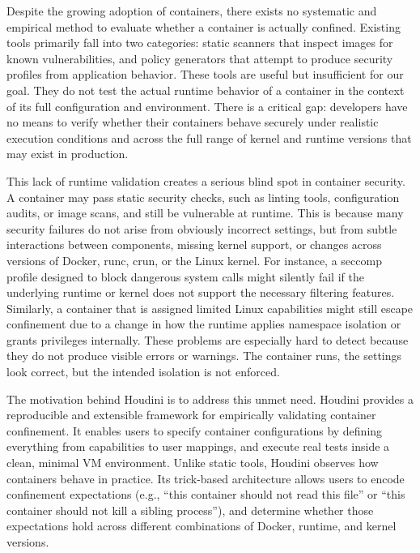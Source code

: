 \documentclass[12pt]{report}
\begin{document}
\begin{doublespace}
Despite the growing adoption of containers, there exists no systematic and empirical method to evaluate whether a container is actually confined. Existing tools primarily fall into two categories: static scanners that inspect images for known vulnerabilities, and policy generators that attempt to produce security profiles from application behavior. These tools are useful but insufficient for our goal. They do not test the actual runtime behavior of a container in the context of its full configuration and environment. There is a critical gap: developers have no means to verify whether their containers behave securely under realistic execution conditions and across the full range of kernel and runtime versions that may exist in production.

This lack of runtime validation creates a serious blind spot in container security. A container may pass static security checks, such as linting tools, configuration audits, or image scans, and still be vulnerable at runtime. This is because many security failures do not arise from obviously incorrect settings, but from subtle interactions between components, missing kernel support, or changes across versions of Docker, runc, crun, or the Linux kernel. For instance, a seccomp profile designed to block dangerous system calls might silently fail if the underlying runtime or kernel does not support the necessary filtering features. Similarly, a container that is assigned limited Linux capabilities might still escape confinement due to a change in how the runtime applies namespace isolation or grants privileges internally. These problems are especially hard to detect because they do not produce visible errors or warnings. The container runs, the settings look correct, but the intended isolation is not enforced.

The motivation behind Houdini is to address this unmet need. Houdini provides a reproducible and extensible framework for empirically validating container confinement. It enables users to specify container configurations by defining everything from capabilities to user mappings, and execute real tests inside a clean, minimal VM environment. Unlike static tools, Houdini observes how containers behave in practice. Its trick-based architecture allows users to encode confinement expectations (e.g., “this container should not read this file” or “this container should not kill a sibling process”), and determine whether those expectations hold across different combinations of Docker, runtime, and kernel versions.


\end{doublespace}
\end{document}
